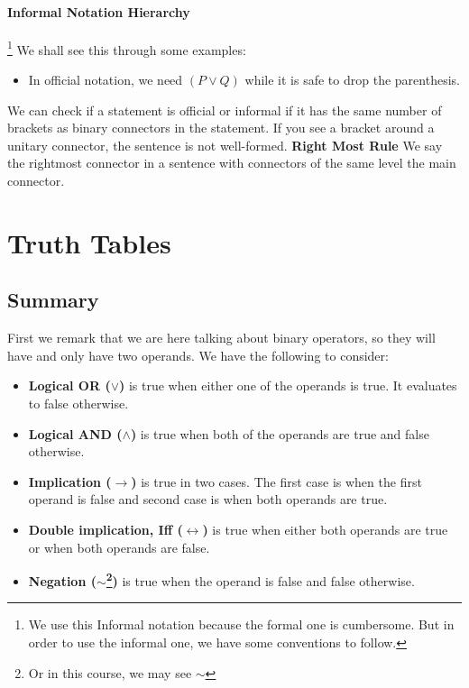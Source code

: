 \documentclass[10pt]{article}
\renewcommand{\iff}{\leftrightarrow}
\renewcommand{\implies}{\rightarrow}
\renewcommand{\neg}{\sim}
\begin{document}
\paragraph{Informal Notation Hierarchy}\footnote{We use this Informal notation because the formal one is cumbersome. But in order to use the informal one, we have some conventions to follow.} 
We shall see this through some examples:
\begin{itemize}
    \item In official notation, we need $(P\vee Q)$ while it is safe to drop the parenthesis.
\end{itemize}
We can check if a statement is official or informal if it has the same number of brackets as binary connectors in the statement. If you see a bracket around a unitary connector, the sentence is not well-formed.
\textbf{Right Most Rule} We say the rightmost connector in a sentence with connectors of the same level the main connector.



\section{Truth Tables}
\subsection{Summary} First we remark that we are here talking about binary operators, 
so they will have and only have two operands. We have the following to consider:
\begin{itemize}
    \item \textbf{Logical OR ($\vee$)} is true when either one of the operands is true. 
        It evaluates to false otherwise.
    \item \textbf{Logical AND ($\land$)} is true when both of the operands are true and false otherwise.
    \item \textbf{Implication ($\implies$)} is true in two cases. The first case is when the
        first operand is false and second case is when both operands are true.
    \item \textbf{Double implication, Iff ($\iff$)} is true when either both operands are true 
        or when both operands are false.
    \item \textbf{Negation ($\neg$\footnote{Or in this course, we may see $\sim$})} is true when the operand
        is false and false otherwise.
\end{itemize}
\end{document}
